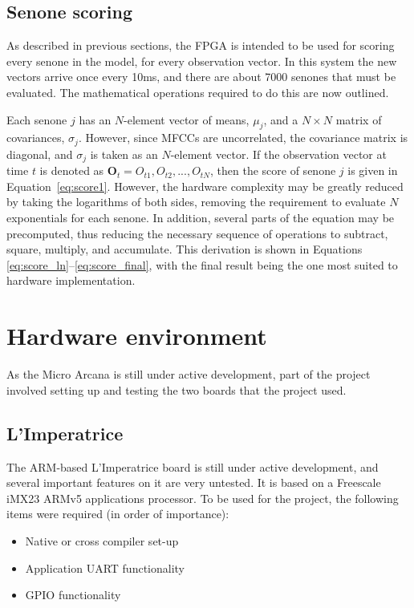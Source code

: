 	\subsection{Senone scoring} %
	\label{sub:senone_scoring}
		As described in previous sections, the FPGA is intended to be used for scoring every senone in the model, for every observation vector.  In this system the new vectors arrive once every 10ms, and there are about 7000 senones that must be evaluated.  The mathematical operations required to do this are now outlined. %

		Each senone $j$ has an $N$-element vector of means, $\mu_j$, and a $N\times N$ matrix of covariances, $\sigma_j$.  However, since MFCCs are uncorrelated, the covariance matrix is diagonal, and $\sigma_j$ is taken as an $N$-element vector.  If the observation vector at time $t$ is denoted as $\mathbf{O}_t = {O_{t1}, O_{t2}, ..., O_{tN}}$, then the score of senone $j$ is given in Equation~\ref{eq:score1}.  However, the hardware complexity may be greatly reduced by taking the logarithms of both sides, removing the requirement to evaluate $N$ exponentials for each senone.  In addition, several parts of the equation may be precomputed, thus reducing the necessary sequence of operations to subtract, square, multiply, and accumulate.  This derivation is shown in Equations \ref{eq:score_ln}--\ref{eq:score_final}, with the final result being the one most suited to hardware implementation.



\section{Hardware environment} %
\label{sec:hardware_dev_env}
	As the Micro Arcana is still under active development, part of the project involved setting up and testing the two boards that the project used.

	\subsection{L'Imperatrice} %
	\label{sub:l_imperatrice_env}
		The ARM-based L'Imperatrice board is still under active development, and several important features on it are very untested.  It is based on a Freescale iMX23 ARMv5 applications processor.  To be used for the project, the following items were required (in order of importance):
		\begin{itemize}
			\item Native or cross compiler set-up
			\item Application UART functionality
			\item GPIO functionality
		\end{itemize}

